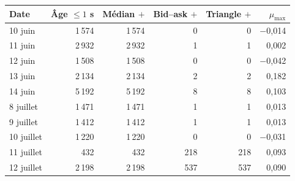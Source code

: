 \begin{tabular}{@{}lrrrrr@{}}
\toprule
Date & Âge $\leq 1$ s & Médian $+$ & Bid--ask $+$ & Triangle $+$ & $\mu_{\max}$\\
\midrule
10 juin & 1\,574 & 1\,574 & 0 & 0 & \ensuremath{-}0,014\\
11 juin & 2\,932 & 2\,932 & 1 & 1 & 0,002\\
12 juin & 1\,508 & 1\,508 & 0 & 0 & \ensuremath{-}0,042\\
13 juin & 2\,134 & 2\,134 & 2 & 2 & 0,182\\
14 juin & 5\,192 & 5\,192 & 8 & 8 & 0,103\\
\midrule
8 juillet & 1\,471 & 1\,471 & 1 & 1 & 0,013\\
9 juillet & 1\,412 & 1\,412 & 1 & 1 & 0,013\\
10 juillet & 1\,220 & 1\,220 & 0 & 0 & \ensuremath{-}0,031\\
11 juillet & 432 & 432 & 218 & 218 & 0,093\\
12 juillet & 2\,198 & 2\,198 & 537 & 537 & 0,090\\
\bottomrule
\end{tabular}
